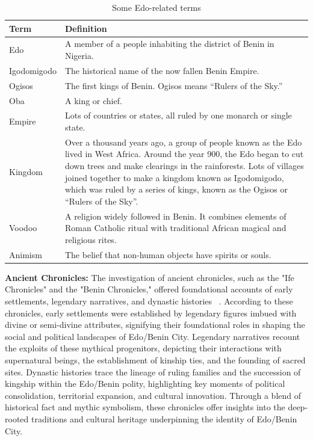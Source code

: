 \begin{table}[htb]
\centering
\caption{Some Edo-related terms\protect\footnotemark}
\label{tab:edo_vocab}
\begin{tabularx}{\linewidth}{|l|X|}
\hline
\textbf{Term} & \textbf{Definition} \\
\hline
Edo & A member of a people inhabiting the district of Benin in Nigeria. \\
\hline
Igodomigodo & The historical name of the now fallen Benin Empire. \\
\hline
Ogisos & The first kings of Benin. Ogisos means “Rulers of the Sky.” \\
\hline
Oba & A king or chief. \\
\hline
Empire & Lots of countries or states, all ruled by one monarch or single state. \\
\hline
Kingdom & Over a thousand years ago, a group of people known as the Edo lived in West Africa. Around the year 900, the Edo began to cut down trees and make clearings in the rainforests. Lots of villages joined together to make a kingdom known as Igodomigodo, which was ruled by a series of kings, known as the Ogisos or “Rulers of the Sky”. \\
\hline
Voodoo & A religion widely followed in Benin. It combines elements of Roman Catholic ritual with traditional African magical and religious rites. \\
\hline
Animism & The belief that non-human objects have spirits or souls. \\
\hline
\end{tabularx}
\end{table}


\vspace{0.5cm}
\textbf{Ancient Chronicles:} The investigation of ancient chronicles, such as the "Ife Chronicles" and the "Benin Chronicles," offered foundational accounts of early settlements, legendary narratives, and dynastic histories ~\cite{otterbein1966}. According to these chronicles, early settlements were established by legendary figures imbued with divine or semi-divine attributes, signifying their foundational roles in shaping the social and political landscapes of Edo/Benin City. Legendary narratives recount the exploits of these mythical progenitors, depicting their interactions with supernatural beings, the establishment of kinship ties, and the founding of sacred sites. Dynastic histories trace the lineage of ruling families and the succession of kingship within the Edo/Benin polity, highlighting key moments of political consolidation, territorial expansion, and cultural innovation. Through a blend of historical fact and mythic symbolism, these chronicles offer insights into the deep-rooted traditions and cultural heritage underpinning the identity of Edo/Benin City.


